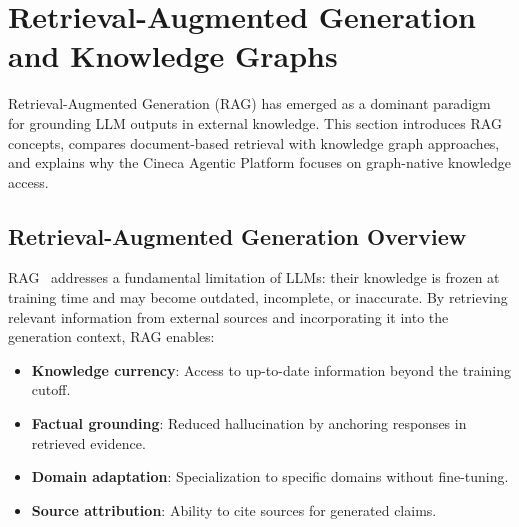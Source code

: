 %
%

\section{Retrieval-Augmented Generation and Knowledge Graphs}
\label{sec:rag-kg}

Retrieval-Augmented Generation (RAG) has emerged as a dominant paradigm for grounding LLM outputs in external knowledge. This section introduces RAG concepts, compares document-based retrieval with knowledge graph approaches, and explains why the Cineca Agentic Platform focuses on graph-native knowledge access.

\subsection{Retrieval-Augmented Generation Overview}

RAG~%
addresses a fundamental limitation of LLMs: their knowledge is frozen at training time and may become outdated, incomplete, or inaccurate. By retrieving relevant information from external sources and incorporating it into the generation context, RAG enables:

\begin{itemize}
    \item \textbf{Knowledge currency}: Access to up-to-date information beyond the training cutoff.
    \item \textbf{Factual grounding}: Reduced hallucination by anchoring responses in retrieved evidence.
    \item \textbf{Domain adaptation}: Specialization to specific domains without fine-tuning.
    \item \textbf{Source attribution}: Ability to cite sources for generated claims.
\end{itemize}

